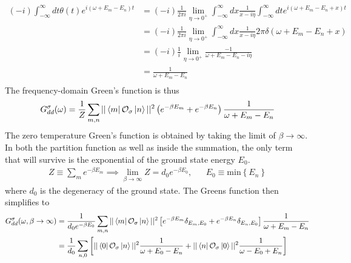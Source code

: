 \documentclass{report}
\numberwithin{equation}{section}
\begin{document}
\begin{appendices}
\begin{equation}
\begin{aligned}
	\left(-i\right)\int_{-\infty}^\infty dt \theta(t)e^{i\left( \omega + E_m - E_n \right)t} &= \left(-i\right)\frac{1}{2\pi i}\lim_{\eta \to 0^+} \int_{-\infty}^\infty dx\frac{1}{x- i\eta}\int_{-\infty}^\infty dt e^{i\left( \omega + E_m - E_n + x\right)t} \\
									     &=\left(-i\right)\frac{1}{2\pi i}\lim_{\eta \to 0^+} \int_{-\infty}^\infty dx\frac{1}{x- i\eta} 2\pi \delta\left( \omega + E_m - E_n + x\right) \\
									     &=\left(-i\right)\frac{1}{i}\lim_{\eta \to 0^+} \frac{-1}{\omega + E_m - E_n- i\eta} \\
									     &=\frac{1}{\omega + E_m - E_n} \\
\end{aligned}\end{equation}
The frequency-domain Green's function is thus
\begin{equation}\begin{aligned}
	G_{d d}^\sigma(\omega) = \frac{1}{Z}\sum_{m,n}||\bra{m}\mathcal{O}_{\sigma}\ket{n}||^2\left( e^{-\beta E_m} + e^{-\beta E_n}\right)\frac{1}{\omega + E_m - E_n}
\end{aligned}\end{equation}
The zero temperature Green's function is obtained by taking the limit of \(\beta \to \infty\). In both the partition function as well as inside the summation, the only term that will survive is the exponential of the ground state energy \(E_0\).
\begin{equation*}\begin{aligned}
	Z \equiv \sum_m e^{-\beta E_m} \implies \lim_{\beta \to \infty}Z = d_0 e^{-\beta E_0}, && E_0 \equiv \text{min}\left\{ E_n \right\} 
\end{aligned}\end{equation*}
where \(d_0\) is the degeneracy of the ground state. The Greens function then simplifies to
\begin{equation}\begin{aligned}
	\label{Gf_lk}
	G_{d d}^\sigma(\omega, \beta \to \infty) &= \frac{1}{d_0e^{-\beta E_0}}\sum_{m,n}||\bra{m}\mathcal{O}_{\sigma}\ket{n}||^2\left[e^{-\beta E_m}\delta_{E_m, E_0} + e^{-\beta E_n}\delta_{E_n, E_0}\right]\frac{1}{\omega + E_m - E_n}\\
						 &= \frac{1}{d_0}\sum_{n,0}\left[||\bra{0}\mathcal{O}_{\sigma}\ket{n}||^2\frac{1}{\omega + E_0 - E_n} + ||\bra{n}\mathcal{O}_{\sigma}\ket{0}||^2\frac{1}{\omega - E_0 + E_n}\right]\\
\end{aligned}\end{equation}

\end{appendices}
\end{document}

